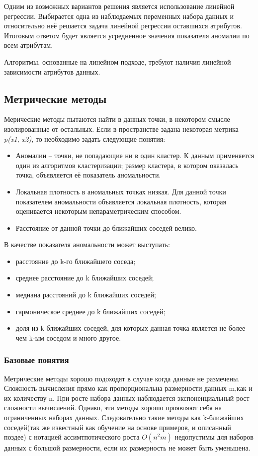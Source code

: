 Одним из возможных вариантов решения является использование линейной регрессии. Выбирается одна из наблюдаемых переменных  набора данных и относительно неё решается задача линейной регрессии оставшихся атрибутов. Итоговым ответом будет является усредненное значения показателя аномалии по всем атрибутам. 

Алгоритмы, основанные на линейном подходе, требуют  наличия линейной зависимости атрибутов данных. 
\subsection{Метрические методы}
Мерические методы пытаются найти в данных точки, в некотором смысле
изолированные от остальных\cite{Book01}. Если в пространстве задана некоторая метрика \textit{p(x1, x2)}, то необходимо задать следующие понятия:
\begin{itemize}
	\item  Аномалии – точки, не попадающие ни в один кластер. К данным применяется один из алгоритмов кластеризации; размер кластера, в котором оказалась точка, объявляется её показатель аномальности.
	\item Локальная плотность в аномальных точках низкая. Для данной точки показателем аномальности объявляется локальная плотность, которая оценивается некоторым непараметрическим способом.
	\item Расстояние от данной точки до ближайших соседей велико.
\end{itemize}
 В качестве показателя аномальности может выступать:
 \begin{itemize}
\item расстояние до k-го ближайшего соседа;
\item среднее расстояние до k ближайших соседей;
\item медиана расстояний до k ближайших соседей;
\item гармоническое среднее до k ближайших соседей;
\item доля из k ближайших соседей, для которых данная точка является не
более чем k-ым соседом и много другое.
\end{itemize}
\subsubsection{Базовые понятия}
Метрические методы хорошо подоходят в случае когда данные не размечены. Сложность вычисления прямо как пропорциональна размерности данных m,как и их количеству n. При росте набора данных наблюдается экспоненциальный рост сложности вычислений. Однако, эти методы хорошо проявляют себя на ограниченных наборах данных\cite{Book07}. Следовательно такие методы как k-ближайших соседей(так же известный как обучение на основе примеров, и описанный поздее) с нотацией ассимтпотического роста $O(n^2m)$ недопустимы для наборов данных с большой размерности, если их размерность не может быть уменьшена.

